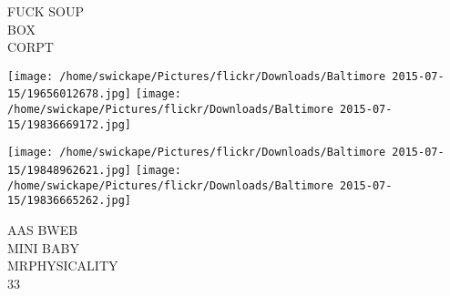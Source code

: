 \documentclass[10pt,letterpaper]{article}
\begin{document}
FUCK SOUP\\
BOX\\
CORPT\\
\pagebreak

\texttt{[image: /home/swickape/Pictures/flickr/Downloads/Baltimore 2015-07-15/19656012678.jpg]}
\texttt{[image: /home/swickape/Pictures/flickr/Downloads/Baltimore 2015-07-15/19836669172.jpg]}

\texttt{[image: /home/swickape/Pictures/flickr/Downloads/Baltimore 2015-07-15/19848962621.jpg]}
\texttt{[image: /home/swickape/Pictures/flickr/Downloads/Baltimore 2015-07-15/19836665262.jpg]}

AAS BWEB\\
MINI BABY\\
MRPHYSICALITY\\
33\\
\pagebreak
\end{document}

